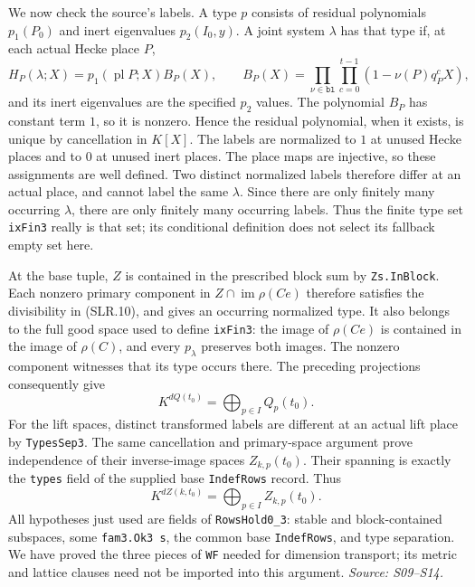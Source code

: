 We now check the source's labels.  A type $p$ consists of residual
polynomials $p_1(P_0)$ and inert eigenvalues $p_2(I_0,y)$.  A joint
system $\lambda$ has that type if, at each actual Hecke place $P$,
\[
 H_P(\lambda;X)=p_1(\operatorname{pl}P;X)B_P(X),\qquad
 B_P(X)=\prod_{\nu\in\texttt{bl}}\prod_{c=0}^{t-1}
                      (1-\nu(P)q_P^cX),                 \tag{SLR.10}
\]
and its inert eigenvalues are the specified $p_2$ values.
The polynomial $B_P$ has constant term $1$, so it is nonzero.
Hence the residual polynomial, when it exists, is unique by cancellation
in $K[X]$.  The labels are normalized to $1$ at unused Hecke places
and to $0$ at unused inert places.  The place maps are injective, so
these assignments are well defined.  Two distinct normalized labels
therefore differ at an actual place, and cannot label the same
$\lambda$.  Since there are only finitely many occurring $\lambda$,
there are only finitely many occurring labels.  Thus the finite type
set \texttt{ixFin3} really is that set; its conditional definition does
not select its fallback empty set here.

At the base tuple, $Z$ is contained in the prescribed block sum by
\texttt{Zs.InBlock}.  Each nonzero primary component in
$Z\cap\operatorname{im}\rho(Ce)$ therefore satisfies the divisibility
in (SLR.10), and gives an occurring normalized type.  It also belongs
to the full good space used to define \texttt{ixFin3}: the image of
$\rho(Ce)$ is contained in the image of $\rho(C)$, and every
$p_\lambda$ preserves both images.  The nonzero component witnesses
that its type occurs there.  The preceding projections consequently
give
\[
        K^{dQ(t_0)}=\bigoplus_{p\in I}Q_p(t_0).           \tag{SLR.11}
\]
For the lift spaces, distinct transformed labels are different at an
actual lift place by \texttt{TypesSep3}.  The same cancellation and
primary-space argument prove independence of their inverse-image
spaces $Z_{k,p}(t_0)$.  Their spanning is exactly the \texttt{types}
field of the supplied base \texttt{IndefRows} record.  Thus
\[
        K^{dZ(k,t_0)}=\bigoplus_{p\in I}Z_{k,p}(t_0).      \tag{SLR.12}
\]
All hypotheses just used are fields of \texttt{RowsHold0\_3}: stable
and block-contained subspaces, some \texttt{fam3.Ok3 s}, the common
base \texttt{IndefRows}, and type separation.  We have proved the
three pieces of \texttt{WF} needed for dimension transport; its metric
and lattice clauses need not be imported into this argument.
\emph{Source: S09--S14.}

